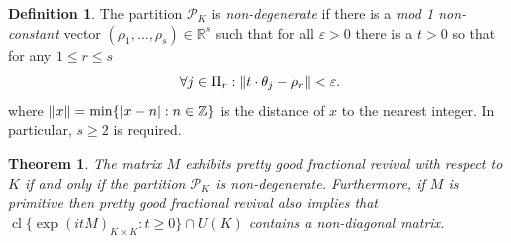 \documentclass[11pt]{article}
\newtheorem{theorem}[theo]{Theorem}
\theoremstyle{definition}
\newtheorem{defi}[theo]{Definition}
\numberwithin{equation}{section}
\newcommand{\PK}[1][K]{\mathcal{P}_{#1}}
\newcommand\+{\mkern2mu}
\newcommand{\R}{\mathbb{R}}
\newcommand{\Z}{\mathbb{Z}}
\newcommand{\ep}{\varepsilon}
\newcommand{\1}{\mathbf 1}
\DeclareMathOperator{\cl}{cl}
\DeclarePairedDelimiter{\abs}{\lvert}{\rvert}
\DeclarePairedDelimiter{\znorm}{\lVert}{\rVert}
\begin{document}
\begin{defi}\label{def:non-deg}
The partition $\PK$ is \emph{non-degenerate} if there is a \emph{mod 1 non-constant} vector $(\rho_1, \dots, \rho_s) \in \R^s$ such that for all $\ep > 0$ there is a $t > 0$ so that for any $1 \leq r \leq s$ 
\begin{equation}\label{eq:approximate} \forall j \in \Pi_r : \znorm{ t \cdot \theta_j - \rho_r} < \ep.\end{equation}
where $\znorm{x} = \min\{\abs{x-n} : n \in \Z\}$ is the distance of $x$ to the nearest integer. In particular, $s \geq 2$ is required.

\end{defi}

\begin{theorem}\label{thm:pgfr_pk}
The matrix $M$ exhibits pretty good fractional revival with respect to $K$ if and only if the partition $\PK$ is non-degenerate. Furthermore, if $M$ is primitive then pretty good fractional revival also implies that $\cl \{ \exp(i t M)_{K \times K} : t \geq 0\} \cap U(K)$ contains a non-diagonal matrix.
\end{theorem}
\end{document}

